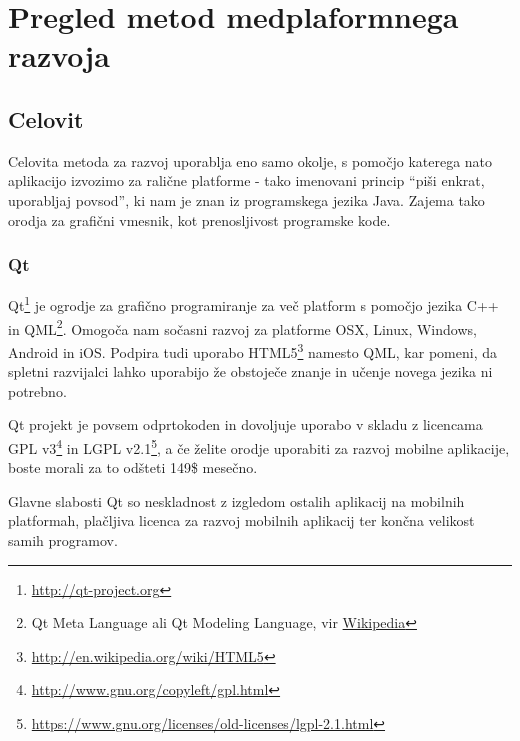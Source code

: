 \graphicspath{{img/}}









\chapter{Pregled metod medplaformnega razvoja}
\label{chap:overview}


\section{Celovit}

Celovita metoda za razvoj uporablja eno samo okolje, s pomočjo katerega nato aplikacijo izvozimo za ralične platforme - tako imenovani princip ``piši enkrat, uporabljaj povsod'', ki nam je znan iz programskega jezika Java. Zajema tako orodja za grafični vmesnik, kot prenosljivost programske kode.

\subsection{Qt}

Qt\footnote{\href{http://qt-project.org}{http://qt-project.org}} je ogrodje za grafično programiranje za več platform s pomočjo jezika C++ in QML\footnote{Qt Meta Language ali Qt Modeling Language, vir \href{http://en.wikipedia.org/wiki/QML}{Wikipedia}}. Omogoča nam sočasni razvoj za platforme OSX, Linux, Windows, Android in iOS. Podpira tudi uporabo HTML5\footnote{\href{http://en.wikipedia.org/wiki/HTML5}{http://en.wikipedia.org/wiki/HTML5}} namesto QML, kar pomeni, da spletni razvijalci lahko uporabijo že obstoječe znanje in učenje novega jezika ni potrebno.

Qt projekt je povsem odprtokoden in dovoljuje uporabo v skladu z licencama GPL v3\footnote{\href{http://www.gnu.org/copyleft/gpl.html}{http://www.gnu.org/copyleft/gpl.html}} in LGPL v2.1\footnote{\href{https://www.gnu.org/licenses/old-licenses/lgpl-2.1.html}{https://www.gnu.org/licenses/old-licenses/lgpl-2.1.html}}, a če želite orodje uporabiti za razvoj mobilne aplikacije, boste morali za to odšteti 149\$ mesečno.

Glavne slabosti Qt so neskladnost z izgledom ostalih aplikacij na mobilnih platformah, plačljiva licenca za razvoj mobilnih aplikacij ter končna velikost samih programov.

